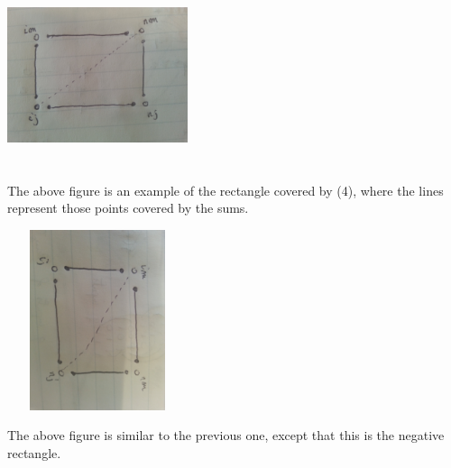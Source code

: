 \documentclass[11pt]{article}
\begin{document}
\includegraphics[height=200px, width=200px]{positiverectangle.jpg}

The above figure is an example of the rectangle covered by (4), where the lines represent those points covered by the sums. 

\includegraphics[height=200px, width=200px]{negativerectangle.jpg}

The above figure is similar to the previous one, except that this is the negative rectangle. 
\end{document}
